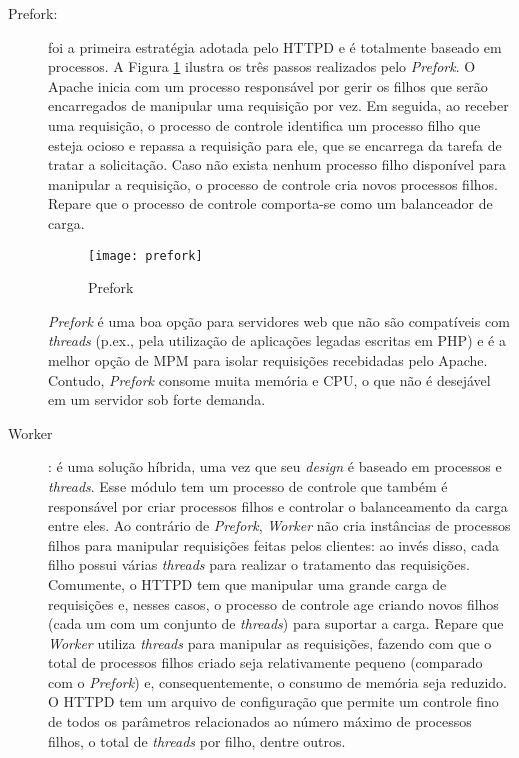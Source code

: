 \begin{description}

	\item[Prefork:]

foi a primeira estratégia adotada pelo HTTPD e é totalmente
baseado em processos. A Figura \ref{fig:prefork} ilustra os três passos
realizados pelo \emph{Prefork}. O Apache inicia com um processo responsável
por gerir os filhos que serão encarregados de manipular uma requisição por vez.
Em seguida, ao receber uma requisição, o processo de controle identifica um
processo filho que esteja ocioso e repassa a requisição para ele, que
se encarrega da tarefa de tratar a solicitação. Caso não exista nenhum
processo filho disponível para manipular a requisição, o processo de
controle cria novos processos filhos. Repare que o processo de controle
comporta-se como um balanceador de carga.

\begin{figure}[!h]
  \centering
  \texttt{[image: prefork]} 
  \caption{Prefork}
  \label{fig:prefork} 
\end{figure}

\emph{Prefork} é uma boa opção para servidores web que não são compatíveis
com \emph{threads} (p.ex., pela utilização de aplicações legadas escritas em PHP) e é a melhor opção de MPM
para isolar requisições recebidadas pelo Apache. Contudo, \emph{Prefork} consome muita
memória e CPU, o que não é desejável em um servidor sob forte demanda.

  \item [Worker]: é uma solução híbrida, uma vez que seu
\emph{design} é baseado em processos e \emph{threads}. Esse módulo tem um
processo de controle que também é responsável por criar processos filhos e
controlar o balanceamento da carga entre eles.  Ao contrário de \emph{Prefork},
\emph{Worker} não cria instâncias de processos filhos para manipular
requisições feitas pelos clientes: ao invés disso, cada filho possui várias
\emph{threads} para realizar o tratamento das requisições. Comumente, o HTTPD
tem que manipular uma grande carga de requisições e, nesses casos, o processo
de controle age criando novos filhos (cada um com um conjunto de
\emph{threads}) para suportar a carga.  Repare que \emph{Worker} utiliza
\emph{threads} para manipular as requisições, fazendo com que o total de
processos filhos criado seja relativamente pequeno (comparado com o
\emph{Prefork}) e, consequentemente, o consumo de memória seja reduzido. O
HTTPD tem um arquivo de configuração que permite um controle fino de todos os
parâmetros relacionados ao número máximo de processos filhos, o total de
\emph{threads} por filho, dentre outros.


\end{description}
